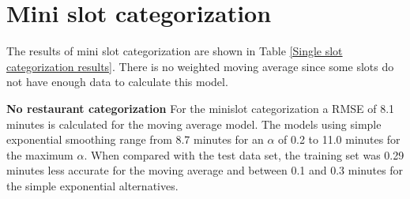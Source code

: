 \section{Mini slot categorization}\label{section:Single slot categorization}
The results of mini slot categorization are shown in Table \ref{Single slot categorization results}. There is no weighted moving average since some slots do not have enough data to calculate this model.
\begin{table}[h]
\centering
\caption{Mini slot categorization results}
\label{Single slot categorization results}
\end{table}
\newline\newline\textbf{No restaurant categorization}\newline
For the minislot categorization a RMSE of 8.1 minutes is calculated for the moving average model. The models using simple exponential smoothing range from 8.7 minutes for an $\alpha$ of 0.2 to 11.0 minutes for the maximum $\alpha$. When compared with the test data set, the training set was 0.29 minutes less accurate for the moving average and between 0.1 and 0.3 minutes for the simple exponential alternatives.\newline
